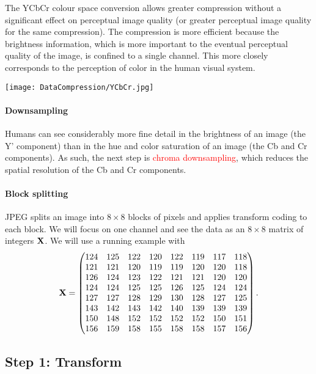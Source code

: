\documentclass[a4paper, 11pt, openany]{book}
\numberwithin{equation}{section}
\theoremstyle{plain}
\theoremstyle{definition}
\newcommand{\Important}[1]{\textcolor{red}{#1}}
\begin{document}
The YCbCr colour space conversion allows greater compression without a significant effect on perceptual image quality (or greater perceptual image quality for the same compression). The compression is more efficient because the brightness information, which is more important to the eventual perceptual quality of the image, is confined to a single channel. This more closely corresponds to the perception of color in the human visual system.


\texttt{[image: DataCompression/YCbCr.jpg]}


\paragraph{Downsampling}
Humans can see considerably more fine detail in the brightness of an image (the Y' component) than in the hue and color saturation of an image (the Cb and Cr components). As such, the next step is \Important{chroma downsampling}, which reduces the spatial resolution of the Cb and Cr components. 



\paragraph{Block splitting} 
JPEG splits an image into $8 \times 8$ blocks of pixels and applies transform coding to each block. We will focus on one channel and see the data as an $8 \times 8$ matrix of integers ${\bf X}$. We will use a running example with
\[
    {\bf X} = \begin{pmatrix}
    124 & 125 & 122 & 120 & 122 & 119 & 117 & 118\\
    121 & 121 & 120 & 119 & 119 & 120 & 120 & 118\\
    126 & 124 & 123 & 122 & 121 & 121 & 120 & 120\\
    124 & 124 & 125 & 125 & 126 & 125 & 124 & 124\\
    127 & 127 & 128 & 129 & 130 & 128 & 127 & 125\\
    143 & 142 & 143 & 142 & 140 & 139 & 139 & 139\\
    150 & 148 & 152 & 152 & 152 & 152 & 150 & 151\\
    156 & 159 & 158 & 155 & 158 & 158 & 157 & 156
    \end{pmatrix}.
\]


\subsection{Step 1: Transform}
\end{document}
